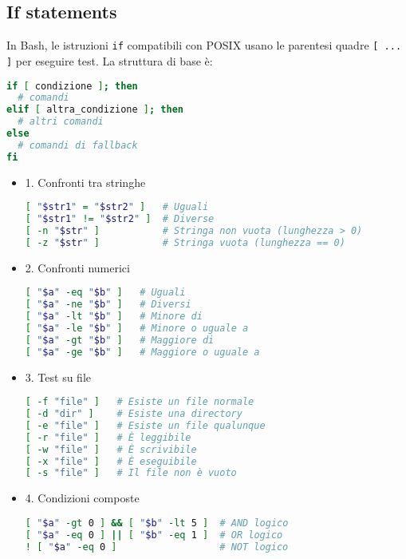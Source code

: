 \subsection{If statements}
In Bash, le istruzioni \texttt{if} compatibili con POSIX usano le parentesi quadre \texttt{[ ... ]} per eseguire test. La struttura di base è:

\begin{lstlisting}[language=bash]
if [ condizione ]; then
  # comandi
elif [ altra_condizione ]; then
  # altri comandi
else
  # comandi di fallback
fi
\end{lstlisting}

\begin{itemize}

	\item 1. Confronti tra stringhe

	      \begin{lstlisting}[language=bash]
[ "$str1" = "$str2" ]   # Uguali
[ "$str1" != "$str2" ]  # Diverse
[ -n "$str" ]           # Stringa non vuota (lunghezza > 0)
[ -z "$str" ]           # Stringa vuota (lunghezza == 0)
\end{lstlisting}

	\item 2. Confronti numerici

	      \begin{lstlisting}[language=bash]
[ "$a" -eq "$b" ]   # Uguali
[ "$a" -ne "$b" ]   # Diversi
[ "$a" -lt "$b" ]   # Minore di
[ "$a" -le "$b" ]   # Minore o uguale a
[ "$a" -gt "$b" ]   # Maggiore di
[ "$a" -ge "$b" ]   # Maggiore o uguale a
\end{lstlisting}

	\item 3. Test su file

	      \begin{lstlisting}[language=bash]
[ -f "file" ]   # Esiste un file normale
[ -d "dir" ]    # Esiste una directory
[ -e "file" ]   # Esiste un file qualunque
[ -r "file" ]   # È leggibile
[ -w "file" ]   # È scrivibile
[ -x "file" ]   # È eseguibile
[ -s "file" ]   # Il file non è vuoto
\end{lstlisting}

	\item 4. Condizioni composte

	      \begin{lstlisting}[language=bash]
[ "$a" -gt 0 ] && [ "$b" -lt 5 ]  # AND logico
[ "$a" -eq 0 ] || [ "$b" -eq 1 ]  # OR logico
! [ "$a" -eq 0 ]                  # NOT logico
\end{lstlisting}

\end{itemize}

